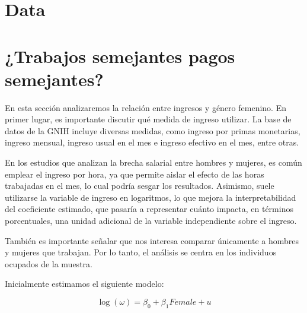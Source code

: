 \documentclass[12pt,a4paper,onecolumn]{article}
\begin{document}
\section{Data}

\section{¿Trabajos semejantes pagos semejantes?}

En esta sección analizaremos la relación entre ingresos y género femenino. 
En primer lugar, es importante discutir qué medida de ingreso utilizar. 
La base de datos de la GNIH incluye diversas medidas, como ingreso por primas monetarias, ingreso mensual, ingreso usual en el mes e ingreso efectivo en el mes, entre otras. 

En los estudios que analizan la brecha salarial entre hombres y mujeres, es común emplear el ingreso por hora, ya que permite aislar el efecto de las horas trabajadas en el mes, lo cual podría sesgar los resultados. 
Asimismo, suele utilizarse la variable de ingreso en logaritmos, lo que mejora la interpretabilidad del coeficiente estimado, que pasaría a representar cuánto impacta, en términos porcentuales, una unidad adicional de la variable independiente sobre el ingreso. 

También es importante señalar que nos interesa comparar únicamente a hombres y mujeres que trabajan. 
Por lo tanto, el análisis se centra en los individuos ocupados de la muestra.

Inicialmente estimamos el siguiente modelo:

\begin{equation}
\log(\omega) = \beta_0 + \beta_1 Female + u 
\label{eq_inc}
\end{equation}
\end{document}
